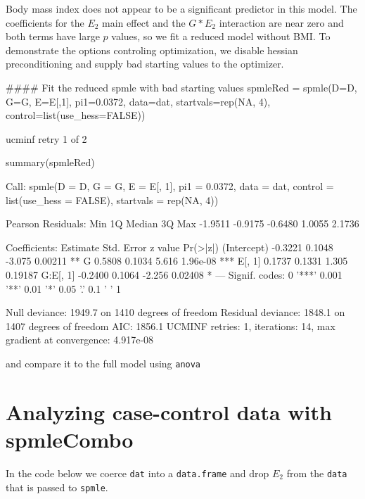 \documentclass{article}\usepackage[]{graphicx}\usepackage[]{color}
\def\code#1{\texttt{#1}}
\begin{document}
Body mass index does not appear to be a significant predictor in this model.  The coefficients for the $E_2$ main effect and the $G*E_2$ interaction are near zero and both terms have large $p$ values, so we fit a reduced model without BMI.  To demonstrate the options controling optimization, we disable hessian preconditioning and supply bad starting values to the optimizer.
\begin{Schunk}
\begin{Sinput}
#### Fit the reduced spmle with bad starting values
spmleRed = spmle(D=D, G=G, E=E[,1], pi1=0.0372, data=dat, startvals=rep(NA, 4),
                 control=list(use_hess=FALSE))
\end{Sinput}
\begin{Soutput}
ucminf retry 1 of 2 
\end{Soutput}
\begin{Sinput}
summary(spmleRed)
\end{Sinput}
\begin{Soutput}

Call:
spmle(D = D, G = G, E = E[, 1], pi1 = 0.0372, data = dat, control = list(use_hess = FALSE), 
    startvals = rep(NA, 4))

Pearson Residuals: 
    Min       1Q   Median       3Q      Max  
-1.9511  -0.9175  -0.6480   1.0055   2.1736  

Coefficients:
            Estimate Std. Error z value Pr(>|z|)    
(Intercept)  -0.3221     0.1048  -3.075  0.00211 ** 
G             0.5808     0.1034   5.616 1.96e-08 ***
E[, 1]        0.1737     0.1331   1.305  0.19187    
G:E[, 1]     -0.2400     0.1064  -2.256  0.02408 *  
---
Signif. codes:  0 '***' 0.001 '**' 0.01 '*' 0.05 '.' 0.1 ' ' 1

    Null deviance: 1949.7  on 1410  degrees of freedom
Residual deviance: 1848.1  on 1407  degrees of freedom
AIC: 1856.1 
UCMINF retries: 1, iterations: 14, max gradient at convergence: 4.917e-08
\end{Soutput}
\end{Schunk}


and compare it to the full model using \code{anova}


\section{Analyzing case-control data with spmleCombo} \label{sec:spmleCombo}

In the code below we coerce \code{dat} into a \code{data.frame} and drop $E_2$ from the \code{data} that is passed to \code{spmle}.








% 
\end{document}
